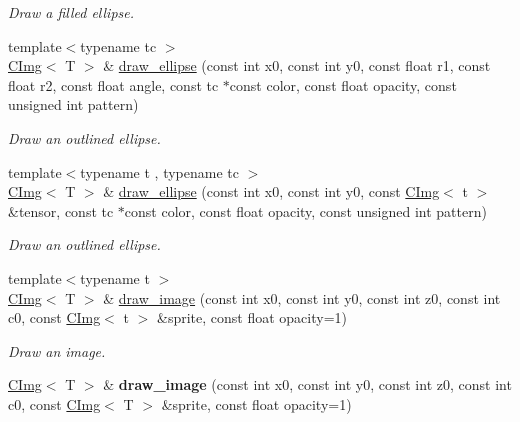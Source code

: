 \begin{DoxyCompactItemize}
\begin{DoxyCompactList}\small\item\em Draw a filled ellipse. \item\end{DoxyCompactList}\item 
{\footnotesize template$<$typename tc $>$ }\\\hyperlink{structcimg__library_1_1CImg}{CImg}$<$ T $>$ \& \hyperlink{structcimg__library_1_1CImg_a00fc522d74acc955e1867540cc369434}{draw\_\-ellipse} (const int x0, const int y0, const float r1, const float r2, const float angle, const tc $\ast$const color, const float opacity, const unsigned int pattern)
\begin{DoxyCompactList}\small\item\em Draw an outlined ellipse. \item\end{DoxyCompactList}\item 
{\footnotesize template$<$typename t , typename tc $>$ }\\\hyperlink{structcimg__library_1_1CImg}{CImg}$<$ T $>$ \& \hyperlink{structcimg__library_1_1CImg_aeae8fb88a9ad0af8f0d8090e7c55ff2e}{draw\_\-ellipse} (const int x0, const int y0, const \hyperlink{structcimg__library_1_1CImg}{CImg}$<$ t $>$ \&tensor, const tc $\ast$const color, const float opacity, const unsigned int pattern)
\begin{DoxyCompactList}\small\item\em Draw an outlined ellipse. \item\end{DoxyCompactList}\item 
{\footnotesize template$<$typename t $>$ }\\\hyperlink{structcimg__library_1_1CImg}{CImg}$<$ T $>$ \& \hyperlink{structcimg__library_1_1CImg_af0dd041cd23a378daafcb5013c9a5267}{draw\_\-image} (const int x0, const int y0, const int z0, const int c0, const \hyperlink{structcimg__library_1_1CImg}{CImg}$<$ t $>$ \&sprite, const float opacity=1)
\begin{DoxyCompactList}\small\item\em Draw an image. \item\end{DoxyCompactList}\item 
\hypertarget{structcimg__library_1_1CImg_a650c5cdb123f3e04ae6b0a05de95252f}{
\hyperlink{structcimg__library_1_1CImg}{CImg}$<$ T $>$ \& {\bfseries draw\_\-image} (const int x0, const int y0, const int z0, const int c0, const \hyperlink{structcimg__library_1_1CImg}{CImg}$<$ T $>$ \&sprite, const float opacity=1)}
\label{structcimg__library_1_1CImg_a650c5cdb123f3e04ae6b0a05de95252f}


\end{DoxyCompactItemize}
